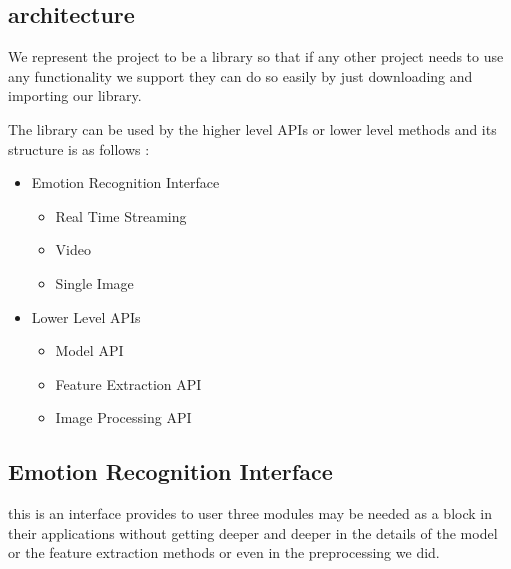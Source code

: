 \subsection{architecture}
We represent the project to be a library so that if any other project needs to use any functionality we support they can do so easily by just downloading and importing our library.
\bigbreak

The library can be used by the higher level APIs or 
lower level methods and its structure is as follows :
\begin{itemize}
	\item Emotion Recognition Interface 
	\begin{itemize}
		\item Real Time Streaming
		\item Video
		\item Single Image
	\end{itemize}
	\item Lower Level APIs
	\begin{itemize}
		\item Model API
		\item Feature Extraction API
		\item Image Processing API
	\end{itemize}
\end{itemize}


\begin{center}
	\subsection{Emotion Recognition Interface}
	this is an interface provides to user three modules may be needed as a block in their applications without getting deeper and deeper in the details of the model or the feature extraction methods or even in the preprocessing we did.   
\end{center}

